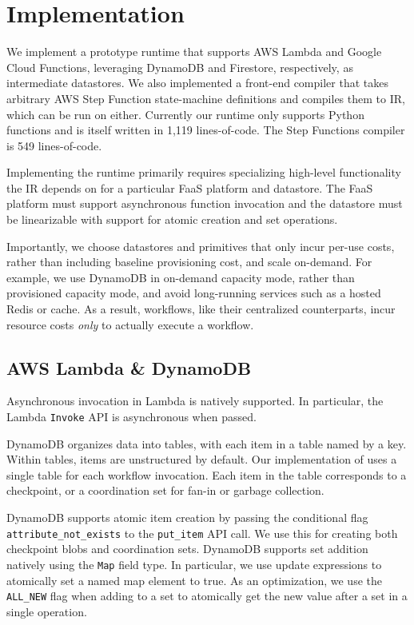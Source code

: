 \section{Implementation}\label{sec:impl}

We implement a prototype \name{} runtime that supports AWS Lambda and Google
Cloud Functions, leveraging DynamoDB and Firestore, respectively, as
intermediate datastores. We also implemented a front-end compiler that takes
arbitrary AWS Step Function state-machine definitions and compiles them to
\name{} IR, which can be run on either. Currently our runtime only supports
Python functions and is itself written in 1,119 lines-of-code. The Step
Functions compiler is 549 lines-of-code.

Implementing the runtime primarily requires specializing high-level
functionality the IR depends on for a particular FaaS platform and datastore.
The FaaS platform must support asynchronous function invocation and the
datastore must be linearizable with support for atomic creation and set
operations.

Importantly, we choose datastores and primitives that only incur per-use costs,
rather than including baseline provisioning cost, and scale on-demand. For
example, we use DynamoDB in on-demand capacity mode, rather than provisioned
capacity mode, and avoid long-running services such as a hosted Redis or cache.
As a result, \name{} workflows, like their centralized counterparts, incur
resource costs \emph{only} to actually execute a workflow.

\subsection{AWS Lambda \& DynamoDB}

Asynchronous invocation in Lambda is natively supported. In particular, the
Lambda \texttt{Invoke} API is asynchronous when passed.

DynamoDB organizes data into tables, with each item in a table named by a key.
Within tables, items are unstructured by default. Our implementation of \name{}
uses a single table for each workflow invocation. Each item in the table
corresponds to a checkpoint, or a coordination set for fan-in or garbage
collection.

DynamoDB supports atomic item creation by passing the conditional flag
\texttt{attribute\_not\_exists} to the \texttt{put\_item} API call. We use this
for creating both checkpoint blobs and coordination sets. DynamoDB supports set
addition natively using the \texttt{Map} field type. In particular, we use
update expressions to atomically set a named map element to true.  As an
optimization, we use the \texttt{ALL\_NEW} flag when adding to a set to
atomically get the new value after a set in a single operation.

